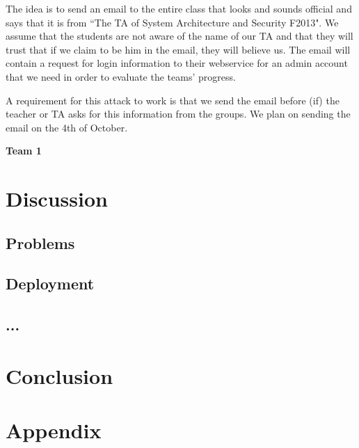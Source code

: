 \documentclass[a4paper]{article}
\begin{document}
The idea is to send an email to the entire class that looks and sounds official and says that it is from ``The TA of System Architecture and Security F2013". We assume that the students are not aware of the name of our TA and that they will trust that if we claim to be him in the email, they will believe us. The email will contain a request for login information to their webservice for an admin account that we need in order to evaluate the teams' progress.

A requirement for this attack to work is that we send the email before (if) the teacher or TA asks for this information from the groups. We plan on sending the email on the 4th of October.


\textbf{Team 1}



\section{Discussion}
\subsection{Problems}
\subsection{Deployment}

\subsection{...}


\section{Conclusion}

\section{Appendix}

\end{document}
